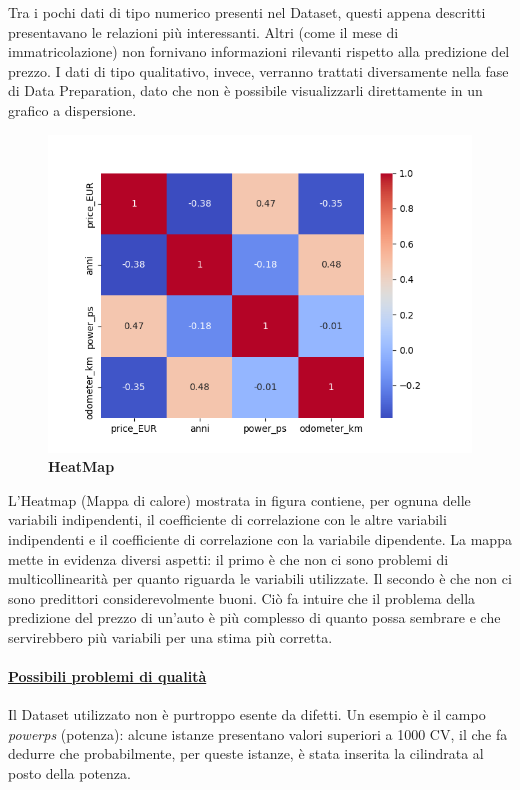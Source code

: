 Tra i pochi dati di tipo numerico presenti nel Dataset, questi appena descritti presentavano le relazioni più interessanti. Altri (come il mese di immatricolazione) non fornivano informazioni rilevanti rispetto alla predizione del prezzo. I dati di tipo qualitativo, invece, verranno trattati diversamente nella fase di Data Preparation, dato che non è possibile visualizzarli direttamente in un grafico a dispersione.
\begin{figure}[H]
    \centering
    \includegraphics[scale=0.6]{Immagini/heatmap}
    \caption{\textbf{HeatMap}}
    \label{fig:anni}
\end{figure}
L'Heatmap (Mappa di calore) mostrata in figura contiene, per ognuna delle variabili indipendenti, il coefficiente di correlazione con le altre variabili indipendenti e il coefficiente di correlazione con la variabile dipendente. La mappa mette in evidenza diversi aspetti: il primo è che non ci sono problemi di multicollinearità per quanto riguarda le variabili utilizzate. Il secondo è che non ci sono predittori considerevolmente buoni. Ciò fa intuire che il problema della predizione del prezzo di un'auto è più complesso di quanto possa sembrare e che servirebbero più variabili per una stima più corretta.
\pagebreak

\paragraph{\textcolor[HTML]{000099}{\underline{Possibili problemi di qualità}}}
Il Dataset utilizzato non è purtroppo esente da difetti. Un esempio è il campo \textit{power\textunderscore ps} (potenza): alcune istanze presentano valori superiori a 1000 CV, il che fa dedurre che probabilmente, per queste istanze, è stata inserita la cilindrata al posto della potenza. 

